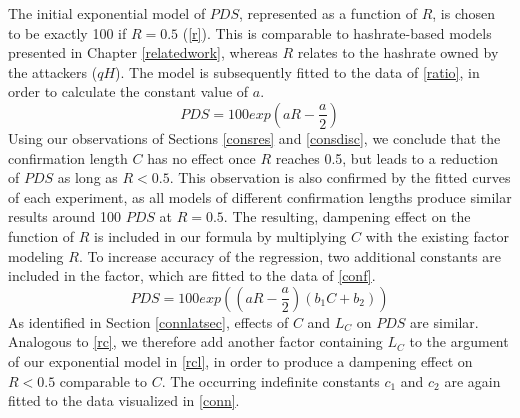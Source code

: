\documentclass[a4paper,12pt,twoside]{report}
\begin{document}
The initial exponential model of $PDS$, represented as a function of $R$, is chosen to be exactly 100 if $R = 0.5$ (\autoref{r}). This is comparable to hashrate-based models presented in Chapter \ref{relatedwork}, whereas $R$ relates to the hashrate owned by the attackers ($qH$).  The model is subsequently fitted to the data of \autoref{ratio}, in order to calculate the constant value of $a$.
\begin{equation}\label{r}
PDS = 100 exp \left(a R- \frac{a}{2} \right)
\end{equation}
Using our observations of Sections \ref{consres} and \ref{consdisc}, we conclude that the confirmation length $C$ has no effect once $R$ reaches 0.5, but leads to a reduction of $PDS$ as long as $R < 0.5$. This observation is also confirmed by the fitted curves of each experiment, as all models of different confirmation lengths produce similar results around 100 $PDS$ at $R = 0.5$. The resulting, dampening effect on the function of $R$ is included in our formula by multiplying $C$ with the existing factor modeling $R$. To increase accuracy of the regression, two additional constants are included in the factor, which are fitted to the data of \autoref{conf}.
\begin{equation}\label{rc}
PDS = 100 exp \left( \left( a R- \frac{a}{2} \right) \left( b_1C+b_2 \right) \right)
\end{equation}
As identified in Section \ref{connlatsec}, effects of $C$ and $L_C$ on $PDS$ are similar. Analogous to \autoref{rc}, we therefore add another factor containing $L_C$ to the argument of our exponential model in \autoref{rcl}, in order to produce a dampening effect on $R < 0.5$ comparable to $C$. The occurring indefinite constants $c_1$ and $c_2$ are again fitted to the data visualized in \autoref{conn}. 
\end{document}
